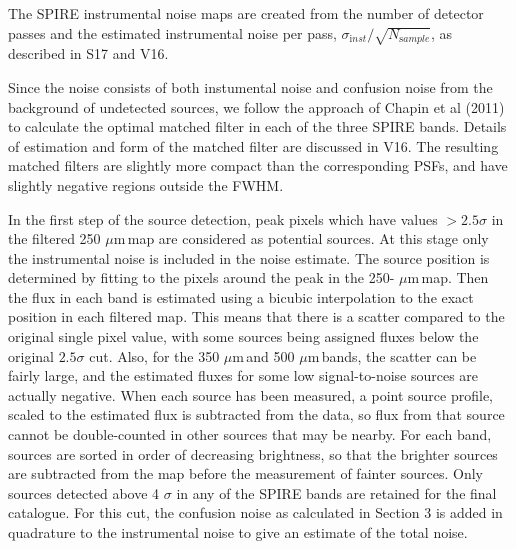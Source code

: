 \documentclass[useAMS,usenatbib]{mn2e}
\def\mic{ $\mu $m\,}
\begin{document}
The SPIRE instrumental noise maps are created from the number of
detector passes and the estimated instrumental noise per pass,
$\sigma_{\mathrm inst} /\sqrt{N_ {\mathrm sample}}$, as described in S17 and V16.

 
Since the noise consists of both instumental noise and
confusion noise from the background of undetected sources, we follow
the approach of Chapin et al (2011) to calculate the optimal matched
filter in each of the three SPIRE bands. Details of estimation and
form of the matched filter are discussed in V16.  The resulting
matched filters are slightly more compact than the corresponding PSFs,
and have slightly negative regions outside the FWHM.  

In the first step of the source detection, peak pixels which have
values $>2.5\sigma$ in the filtered 250\mic map are considered as
potential sources. At this stage only the instrumental noise is
included in the noise estimate. The source position is determined by
fitting to the pixels around the peak in the 250-\mic map. Then the
flux in each band is estimated using a bicubic interpolation to the
exact position in each filtered map. This means that there is a
scatter compared to the original single pixel value, with some sources
being assigned fluxes below the original $2.5\sigma$ cut. Also, for
the 350\mic and 500\mic bands, the scatter can be fairly large, and
the estimated fluxes for some low signal-to-noise sources are actually
negative.  When each source has been measured, a point source profile,
scaled to the estimated flux is subtracted from the data, so flux from
that source cannot be double-counted in other sources that may be
nearby. For each band, sources are sorted in order of decreasing
brightness, so that the brighter sources are subtracted from the map
before the measurement of fainter sources.  Only sources detected
above 4 $\sigma$ in any of the SPIRE bands are retained for the final
catalogue. For this cut, the confusion noise as calculated in Section
3 is added in quadrature to the instrumental noise to give an estimate
of the total noise.
\end{document}
